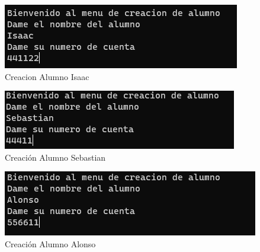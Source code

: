 \documentclass{report}
\begin{document}
\begin{figure}[h]
    \centering
    \includegraphics[width=1\linewidth]{Imagen7.png}
    \caption{Creacion Alumno Isaac}
    
\end{figure}
\begin{figure}[h]
    \centering
    \includegraphics[width=1\linewidth]{Imagen8.png}
    \caption{Creación Alumno Sebastian}
    
\end{figure}
\begin{figure}[h]
    \centering
    \includegraphics[width=1\linewidth]{Imagen9.png}
    \caption{Creación Alumno Alonso}
    
\end{figure}
\end{document}

